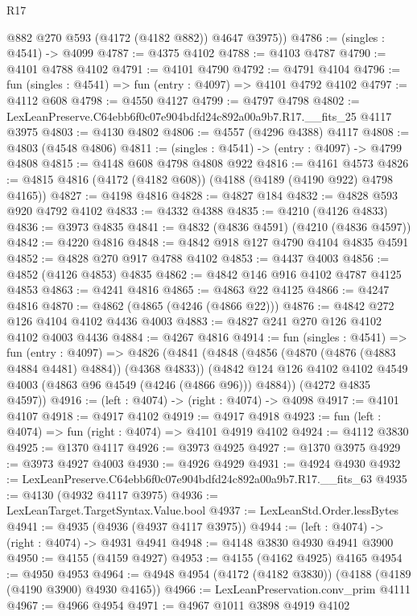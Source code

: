 \begin{lexlean}{R17}
\begin{coremodule}
        @882
        @270
        @593
        (@4172 (@4182 @882))
        @4647
        @3975))
@4786 := (singles : @4541) -> @4099
@4787 := @4375 @4102
@4788 := @4103 @4787
@4790 := @4101 @4788 @4102
@4791 := @4101 @4790
@4792 := @4791 @4104
@4796 := fun (singles : @4541) => fun (entry : @4097) => @4101 @4792 @4102
@4797 := @4112 @608
@4798 := @4550 @4127
@4799 := @4797 @4798
@4802 := LexLeanPreserve.C64ebb6f0c07e904bdfd24c892a00a9b7.R17.__fits_25 @4117 @3975
@4803 := @4130 @4802
@4806 := @4557 (@4296 @4388) @4117
@4808 := @4803 (@4548 @4806)
@4811 := (singles : @4541) -> (entry : @4097) -> @4799 @4808
@4815 := @4148 @608 @4798 @4808 @922
@4816 := @4161 @4573
@4826 := @4815 @4816 (@4172 (@4182 @608)) (@4188 (@4189 (@4190 @922) @4798 @4165))
@4827 := @4198 @4816
@4828 := @4827 @184
@4832 := @4828 @593 @920 @4792 @4102
@4833 := @4332 @4388
@4835 := @4210 (@4126 @4833)
@4836 := @3973 @4835
@4841 := @4832 (@4836 @4591) (@4210 (@4836 @4597))
@4842 := @4220 @4816
@4848 := @4842 @918 @127 @4790 @4104 @4835 @4591
@4852 := @4828 @270 @917 @4788 @4102
@4853 := @4437 @4003
@4856 := @4852 (@4126 @4853) @4835
@4862 := @4842 @146 @916 @4102 @4787 @4125 @4853
@4863 := @4241 @4816
@4865 := @4863 @22 @4125
@4866 := @4247 @4816
@4870 := @4862 (@4865 (@4246 (@4866 @22)))
@4876 := @4842 @272 @126 @4104 @4102 @4436 @4003
@4883 := @4827 @241 @270 @126 @4102 @4102 @4003 @4436
@4884 := @4267 @4816
@4914 := fun (singles : @4541) =>
  fun (entry : @4097) =>
  @4826
    (@4841
      (@4848
        (@4856 (@4870 (@4876 (@4883 @4884 @4481) @4884)) (@4368 @4833))
        (@4842 @124 @126 @4102 @4102 @4549 @4003 (@4863 @96 @4549 (@4246 (@4866 @96))) @4884))
      (@4272 @4835 @4597))
@4916 := (left : @4074) -> (right : @4074) -> @4098
@4917 := @4101 @4107
@4918 := @4917 @4102
@4919 := @4917 @4918
@4923 := fun (left : @4074) => fun (right : @4074) => @4101 @4919 @4102
@4924 := @4112 @3830
@4925 := @1370 @4117
@4926 := @3973 @4925
@4927 := @1370 @3975
@4929 := @3973 @4927 @4003
@4930 := @4926 @4929
@4931 := @4924 @4930
@4932 := LexLeanPreserve.C64ebb6f0c07e904bdfd24c892a00a9b7.R17.__fits_63
@4935 := @4130 (@4932 @4117 @3975)
@4936 := LexLeanTarget.TargetSyntax.Value.bool
@4937 := LexLeanStd.Order.lessBytes
@4941 := @4935 (@4936 (@4937 @4117 @3975))
@4944 := (left : @4074) -> (right : @4074) -> @4931 @4941
@4948 := @4148 @3830 @4930 @4941 @3900
@4950 := @4155 (@4159 @4927)
@4953 := @4155 (@4162 @4925) @4165
@4954 := @4950 @4953
@4964 := @4948 @4954 (@4172 (@4182 @3830)) (@4188 (@4189 (@4190 @3900) @4930 @4165))
@4966 := LexLeanPreservation.conv_prim @4111
@4967 := @4966 @4954
@4971 := @4967 @1011 @3898 @4919 @4102

\end{coremodule}
\end{lexlean}
